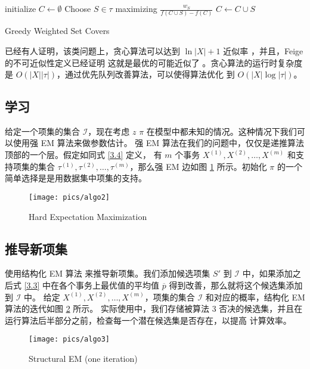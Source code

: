\documentclass{ctexart}
\newcommand{\scri}[0]{\mathcal{I}}
\begin{document}
\begin{algorithm}[H]
	initialize $C \leftarrow \emptyset$ \;
	 {
		Choose $S \in \tau$ maximizing $\frac{w_S}{ f(C \cup {S}) - f(C) }$ \;
		$C \leftarrow C \cup {S}$ \;
	}
\caption{Greedy Weighted Set Covers}
\end{algorithm}

已经有人证明，该类问题上，贪心算法可以达到 $\ln |X| + 1$ 近似率 \cite{chivatal}，并且，Feige 的不可近似性定义已经证明
这就是最优的可能近似了 \cite{feige}。贪心算法的运行时复杂度是 $O(|X| |\tau|)$，通过优先队列改善算法，可以使得算法优化
到 $O(|X| \log |\tau|)$。

\subsection{学习}

给定一个项集的集合 $\scri$，现在考虑 $z$ $\pi$ 在模型中都未知的情况。这种情况下我们可以使用强 EM 算法来做参数估计。
强 EM 算法在我们的问题中，仅仅是递推算法顶部的一个层。假定如同式 \ref{3.4} 定义，
有 $m$ 个事务 $X^{(1)}, X^{(2)}, \dots, X^{(m)} $ 和支持项集的集合
$\tau^{(1)}, \tau^{(2)}, \dots, \tau^{(m)} $，那么强 EM 边如图 \ref{fig:algo2} 所示。初始化 $\pi$ 的一个简单选择是是用数据集中项集的支持。

\begin{figure}
\centering
\texttt{[image: pics/algo2]}
\caption{Hard Expectation Maximization}
\label{fig:algo2}
\end{figure}

\subsection{推导新项集}

使用结构化 EM 算法 \cite{friedman} 来推导新项集。我们添加候选项集 $S'$ 到 $\scri$ 中，如果添加之后式 \ref{3.3}
中在各个事务上最优值的平均值 $\overline{p}$ 得到改善，那么就将这个候选集添加到 $\scri$ 中。
给定 $X^{(1)}, X^{(2)}, \dots, X^{(m)}$，项集的集合 $\scri$ 和对应的概率，结构化 EM 算法的迭代如图 \ref{fig:algo3} 所示。
实际使用中，我们存储被算法 3 否决的候选集，并且在运行算法后半部分之前，检查每一个潜在候选集是否存在，以提高
计算效率。

\begin{figure}
	\centering
	\texttt{[image: pics/algo3]}
	\caption{Structural EM (one iteration)}
	\label{fig:algo3}
\end{figure}
\end{document}
